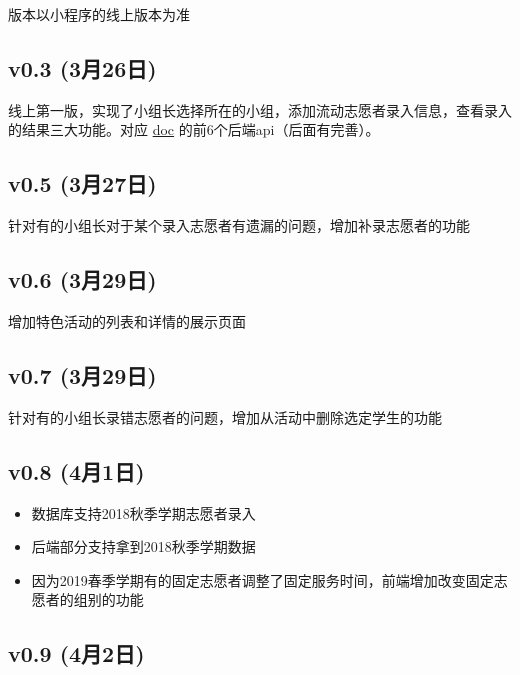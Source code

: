 \documentclass[]{ctexart}
\begin{document}
版本以小程序的线上版本为准

\subsection{v0.3 (3月26日)}\label{v0.3-3ux670826ux65e5}

线上第一版，实现了小组长选择所在的小组，添加流动志愿者录入信息，查看录入的结果三大功能。对应
\href{doc.md}{doc} 的前6个后端api（后面有完善）。

\hypertarget{v0.5-3ux670827ux65e5}{%
\subsection{v0.5 (3月27日)}\label{v0.5-3ux670827ux65e5}}

针对有的小组长对于某个录入志愿者有遗漏的问题，增加补录志愿者的功能

\hypertarget{v0.6-3ux670829ux65e5}{%
\subsection{v0.6 (3月29日)}\label{v0.6-3ux670829ux65e5}}

增加特色活动的列表和详情的展示页面

\hypertarget{v0.7-3ux670829ux65e5}{%
\subsection{v0.7 (3月29日)}\label{v0.7-3ux670829ux65e5}}

针对有的小组长录错志愿者的问题，增加从活动中删除选定学生的功能

\hypertarget{v0.8-4ux67081ux65e5}{%
\subsection{v0.8 (4月1日)}\label{v0.8-4ux67081ux65e5}}

\begin{itemize}
\item
  数据库支持2018秋季学期志愿者录入
\item
  后端部分支持拿到2018秋季学期数据
\item
  因为2019春季学期有的固定志愿者调整了固定服务时间，前端增加改变固定志愿者的组别的功能
\end{itemize}

\hypertarget{v0.9-4ux67082ux65e5}{%
\subsection{v0.9 (4月2日)}\label{v0.9-4ux67082ux65e5}}
\end{document}
